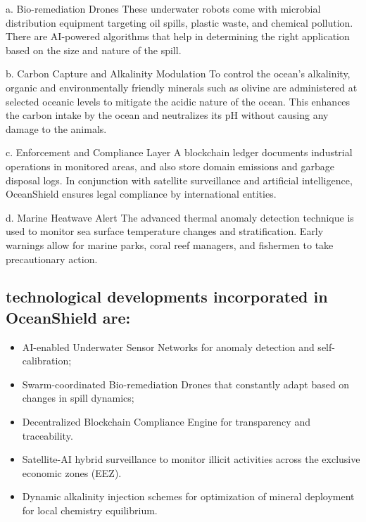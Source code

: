 \documentclass[a4paper]{article}
\begin{document}
a. Bio-remediation Drones
These underwater robots come with microbial distribution equipment targeting oil spills, plastic waste, and chemical pollution. There are AI-powered algorithms that help in determining the right application based on the size and nature of the spill.

b. Carbon Capture and Alkalinity Modulation
To control the ocean’s alkalinity, organic and environmentally friendly minerals such as olivine are administered at selected oceanic levels to mitigate the acidic nature of the ocean. This enhances the carbon intake by the ocean and neutralizes its pH without causing any damage to the animals.

c. Enforcement and Compliance Layer
A blockchain ledger documents industrial operations in monitored areas, and also store domain emissions and garbage disposal logs. In conjunction with satellite surveillance and artificial intelligence, OceanShield ensures legal compliance by international entities.

d. Marine Heatwave Alert 
The advanced thermal anomaly detection technique is used to monitor sea surface temperature changes and stratification. Early warnings allow for marine parks, coral reef managers, and fishermen to take precautionary action. 

\subsection{technological developments incorporated in OceanShield are:}
 
\begin{itemize}
    \item AI-enabled Underwater Sensor Networks for anomaly detection and self-calibration;

    \item Swarm-coordinated Bio-remediation Drones that constantly adapt based on changes in spill dynamics;

    \item Decentralized Blockchain Compliance Engine for transparency and traceability.

    \item Satellite-AI hybrid surveillance to monitor illicit activities across the exclusive economic zones (EEZ).

    \item Dynamic alkalinity injection schemes for optimization of mineral deployment for local chemistry equilibrium.
\end{itemize}
\end{document}
